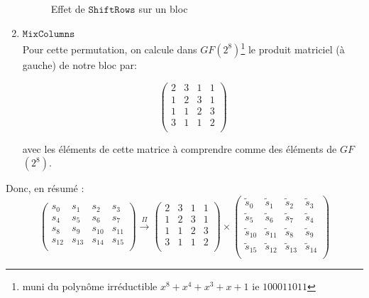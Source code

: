 \documentclass[a4paper, 12pt]{article}
\begin{document}
\begin{enumerate}
\begin{figure}[H]
		\caption{Effet de $\mathtt{ShiftRows}$ sur un bloc}
		\label{illu_shiftrows}
		\end{figure}

	\item $\mathtt{MixColumns}$\label{mixcolumns} \\
		Pour cette permutation, on calcule dans \hyperref[GF]{$GF$}$\left(2^8\right)$\footnote{muni du polynôme irréductible $x^8 + x^4 + x^3 + x + 1$ ie $100011011$} le produit matriciel (à gauche) de notre bloc par:
		
		$$
		\begin{pmatrix}
			2 & 3 & 1 & 1 \\
			1 & 2 & 3 & 1 \\
			1 & 1 & 2 & 3 \\
			3 & 1 & 1 & 2 \\
		\end{pmatrix}
		$$
		
		\noindent avec les éléments de cette matrice à comprendre comme des éléments de \hyperref[GF]{$GF$}$\left(2^8\right)$. \\
\end{enumerate}

\noindent Donc, en résumé : 
$$
\begin{pmatrix}
	s_{0} & s_{1} & s_{2} & s_{3} \\
	s_{4} & s_{5} & s_{6} & s_{7} \\
	s_{8} & s_{9} & s_{10} & s_{11} \\
	s_{12} & s_{13} & s_{14} & s_{15} \\
\end{pmatrix}
\overset{\Pi}{\rightarrow}
\begin{pmatrix}
	2 & 3 & 1 & 1 \\
	1 & 2 & 3 & 1 \\
	1 & 1 & 2 & 3 \\
	3 & 1 & 1 & 2 \\
\end{pmatrix}
\times
\begin{pmatrix}
	\tilde{s}_0 & \tilde{s}_1 & \tilde{s}_2 & \tilde{s}_3 \\
	\tilde{s}_5 & \tilde{s}_6 & \tilde{s}_7 & \tilde{s}_4 \\
	\tilde{s}_{10} & \tilde{s}_{11} & \tilde{s}_8 & \tilde{s}_9 \\
	\tilde{s}_{15} & \tilde{s}_{12} & \tilde{s}_{13} & \tilde{s}_{14} \\
\end{pmatrix}
$$
\end{document}
